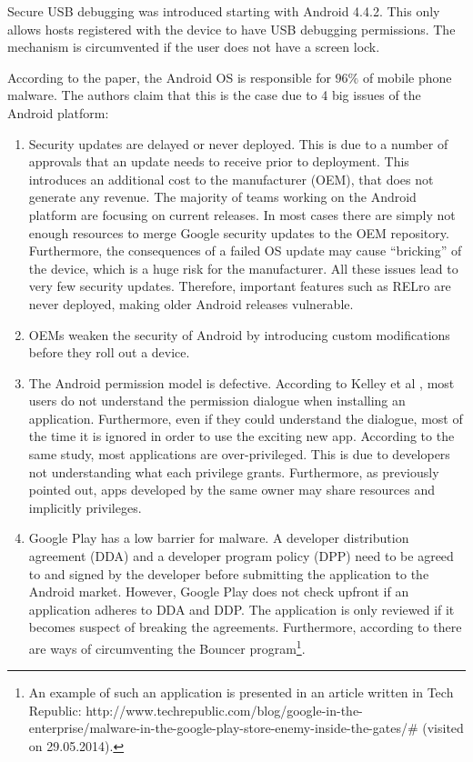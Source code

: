 Secure USB debugging was introduced starting with Android 4.4.2. This only allows hosts registered with the device to have USB debugging permissions. The mechanism is circumvented if the user does not have a screen lock.

According to the paper, the Android OS is responsible for $96\%$ of mobile phone malware. The authors claim that this is the case due to 4 big issues of the Android platform:
\begin{enumerate}
	\item Security updates are delayed or never deployed. This is due to a number of approvals that an update needs to receive prior to deployment. This introduces an additional cost to the manufacturer (OEM), that does not generate any revenue. The majority of teams working on the Android platform are focusing on current releases. In most cases there are simply not enough resources to merge Google security updates to the OEM repository. Furthermore, the consequences of a failed OS update may cause ``bricking'' of the device, which is a huge risk for the manufacturer. All these issues lead to very few security updates. Therefore, important features such as RELro are never deployed, making older Android releases vulnerable.
	
	\item OEMs weaken the security of Android by introducing custom modifications before they roll out a device.
	
	\item The Android permission model is defective. According to Kelley et al \cite{kelley2012conundrum}, most users do not understand the permission dialogue when installing an application. Furthermore, even if they could understand the dialogue, most of the time it is ignored in order to use the exciting new app. According to the same study, most applications are over-privileged. This is due to developers not understanding what each privilege grants. Furthermore, as previously pointed out, apps developed by the same owner may share resources and implicitly privileges.
	
	\item Google Play has a low barrier for malware. A developer distribution agreement (DDA) and a developer program policy (DPP) need to be agreed to and signed by the developer before submitting the application to the Android market. However, Google Play does not check upfront if an application adheres to DDA and DDP. The application is only reviewed if it becomes suspect of breaking the agreements. Furthermore, according to \cite{percoco2012adventures} there are ways of circumventing the Bouncer program\footnote{An example of such an application is presented in an article written in Tech Republic: http://www.techrepublic.com/blog/google-in-the-enterprise/malware-in-the-google-play-store-enemy-inside-the-gates/\# (visited on 29.05.2014).}. 
\end{enumerate}

